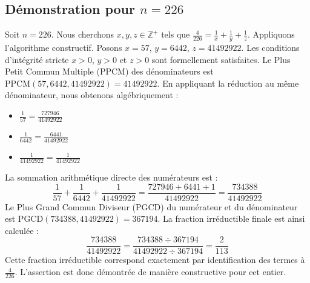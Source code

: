 \documentclass[11pt,a4paper]{article}
\begin{document}
\subsection{Démonstration pour $n = 226$}
Soit $n = 226$. Nous cherchons $x, y, z \in \mathbb{Z}^{+}$ tels que $\frac{4}{226} = \frac{1}{x} + \frac{1}{y} + \frac{1}{z}$.
Appliquons l'algorithme constructif. Posons $x = 57$, $y = 6442$, $z = 41492922$.
Les conditions d'intégrité stricte $x > 0$, $y > 0$ et $z > 0$ sont formellement satisfaites.
Le Plus Petit Commun Multiple (PPCM) des dénominateurs est $\text{PPCM}(57, 6442, 41492922) = 41492922$.
En appliquant la réduction au même dénominateur, nous obtenons algébriquement :
\begin{itemize}
    \item $\frac{1}{57} = \frac{727946}{41492922}$
    \item $\frac{1}{6442} = \frac{6441}{41492922}$
    \item $\frac{1}{41492922} = \frac{1}{41492922}$
\end{itemize}
La sommation arithmétique directe des numérateurs est :
$$ \frac{1}{57} + \frac{1}{6442} + \frac{1}{41492922} = \frac{727946 + 6441 + 1}{41492922} = \frac{734388}{41492922} $$
Le Plus Grand Commun Diviseur (PGCD) du numérateur et du dénominateur est $\text{PGCD}(734388, 41492922) = 367194$.
La fraction irréductible finale est ainsi calculée :
$$ \frac{734388}{41492922} = \frac{734388 \div 367194}{41492922 \div 367194} = \frac{2}{113} $$
Cette fraction irréductible correspond exactement par identification des termes à $\frac{4}{226}$. L'assertion est donc démontrée de manière constructive pour cet entier.
\end{document}
